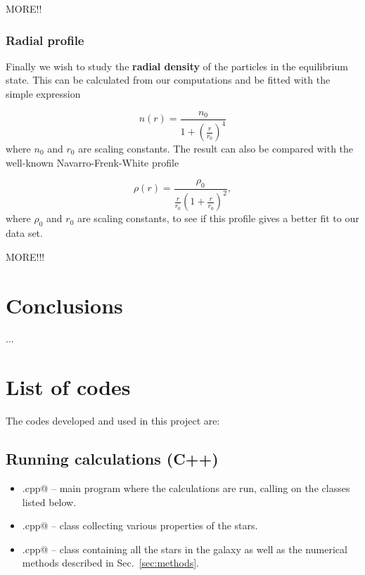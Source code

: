 \documentclass{article}
\begin{document}
\begin{multicols}{2}
MORE!!



\subsubsection{Radial profile}

Finally we wish to study the \textbf{radial density} of the particles in the equilibrium state. This can be calculated from our computations and be fitted with the simple expression

\begin{equation}\label{eq:simple_fit}
	n(r) = \frac{n_0}{1 + (\frac{r}{r_0})^4}
\end{equation}
where $n_0$ and $r_0$ are scaling constants. The result can also be compared with the well-known Navarro-Frenk-White profile

\begin{equation}\label{eq:NFW}
	\rho(r) = \frac{\rho_0}{  \frac{r}{r_0} (1 + \frac{r}{r_0})^2  },
\end{equation}
where $\rho_0$ and $r_0$ are scaling constants, to see if this profile gives a better fit to our data set. 

MORE!!!






\section{Conclusions}

...




\section{List of codes}

The codes developed and used in this project are: 


\subsection{Running calculations (C++)}

\begin{itemize}
	\item \verb@main.cpp@ -- main program where the calculations are run, calling on the classes listed below. 
	\item \verb@star.cpp@ -- class collecting various properties of the stars.
	\item \verb@galaxy.cpp@ -- class containing all the stars in the galaxy as well as the numerical methods described in Sec.~\ref{sec:methods}.
\end{itemize}



\end{multicols}
\end{document}
